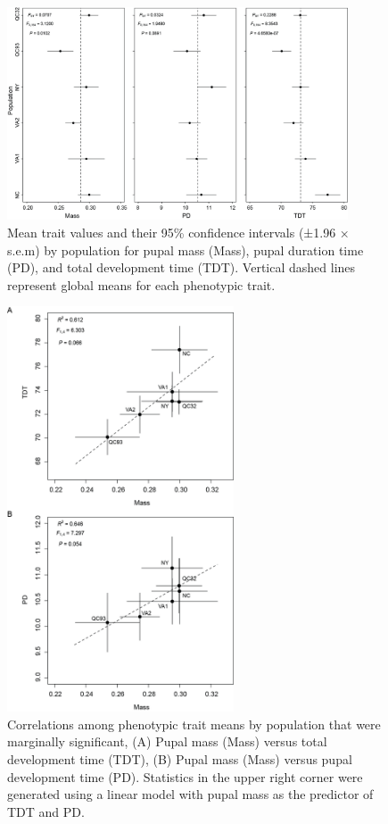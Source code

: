 \documentclass[smallextended]{svjour3}
\begin{document}
\begin{figure}[h]
\centering
\includegraphics[width=0.9\textwidth]{media/image1.png}
\caption{Mean trait values and their 95\% confidence
intervals (±1.96 × s.e.m) by population for pupal mass (Mass), pupal
duration time (PD), and total development time (TDT). Vertical dashed
lines represent global means for each phenotypic trait.}
\label{fig:trait}
\end{figure}

\newpage


\begin{figure}[h]
\centering
\includegraphics[width=0.6\textwidth]{media/image2.png}
\caption{Correlations among phenotypic trait means by
population that were marginally significant, (A) Pupal mass (Mass)
versus total development time (TDT), (B) Pupal mass (Mass) versus pupal
development time (PD). Statistics in the upper right corner were
generated using a linear model with pupal mass as the predictor of TDT
and PD.}
\label{fig:traitcorr}
\end{figure}
\end{document}
